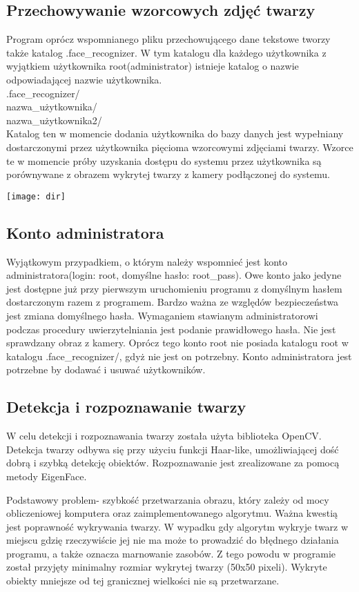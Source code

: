 \documentclass[eng,printmode]{mgr}
\begin{document}
\subsection{Przechowywanie wzorcowych zdjęć twarzy}
Program oprócz wspomnianego pliku przechowującego dane tekstowe tworzy także katalog .face\_recognizer. W tym katalogu dla każdego użytkownika z wyjątkiem użytkownika root(administrator) istnieje katalog o nazwie odpowiadającej nazwie użytkownika.
\\
.face\_recognizer/\\
\textbullet nazwa\_użytkownika/\\
\textbullet nazwa\_użytkownika2/\\

Katalog ten w momencie dodania użytkownika do bazy danych jest wypełniany dostarczonymi przez użytkownika  pięcioma wzorcowymi zdjęciami twarzy. Wzorce te w momencie próby uzyskania dostępu do systemu przez użytkownika są porównywane z obrazem wykrytej twarzy z kamery podłączonej do systemu.

\texttt{[image: dir]}
\subsection{Konto administratora}
Wyjątkowym przypadkiem, o którym należy wspomnieć jest konto administratora(login: root, domyślne hasło: root\_pass). Owe konto jako jedyne jest dostępne już przy pierwszym uruchomieniu programu z domyślnym hasłem dostarczonym razem z programem. Bardzo ważna ze względów bezpieczeństwa jest zmiana domyślnego hasła. Wymaganiem stawianym administratorowi podczas procedury uwierzytelniania jest podanie prawidłowego hasła. Nie jest sprawdzany obraz z kamery. Oprócz tego konto root nie posiada katalogu root w katalogu .face\_recognizer/, gdyż nie jest on potrzebny. Konto administratora jest potrzebne by dodawać i usuwać użytkowników.

\subsection{Detekcja i rozpoznawanie twarzy}
W celu detekcji i rozpoznawania twarzy została użyta biblioteka OpenCV. Detekcja twarzy odbywa się przy użyciu funkcji Haar-like, umożliwiającej dość dobrą i szybką detekcję obiektów. Rozpoznawanie jest zrealizowane za pomocą metody EigenFace.

Podstawowy problem- szybkość przetwarzania obrazu, który zależy od mocy obliczeniowej komputera oraz zaimplementowanego algorytmu. Ważna kwestią jest poprawność wykrywania twarzy. W wypadku gdy algorytm wykryje twarz w miejscu gdzię rzeczywiście jej nie ma może to prowadzić do błędnego działania programu, a także oznacza marnowanie zasobów. Z tego powodu w programie został przyjęty minimalny rozmiar wykrytej twarzy (50x50 pixeli). Wykryte obiekty mniejsze od tej granicznej wielkości nie są przetwarzane.
\end{document}
